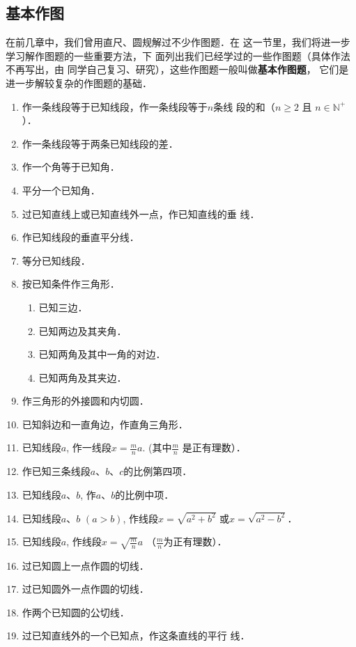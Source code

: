 \subsection{基本作图}
在前几章中，我们曾用直尺、圆规解过不少作图题．在
这一节里，我们将进一步学习解作图题的一些重要方法，下
面列出我们已经学过的一些作图题（具体作法不再写出，由
同学自己复习、研究），这些作图题一般叫做\textbf{基本作图题}，
它们是进一步解较复杂的作图题的基础．
\begin{enumerate}
\item 作一条线段等于已知线段，作一条线段等于$n$条线
段的和（$n\ge 2$ 且 $n\in\mathbb{N}^+$）．
\item 作一条线段等于两条已知线段的差．
\item 作一个角等于已知角．
\item 平分一个已知角．
\item 过已知直线上或已知直线外一点，作已知直线的垂
线．
\item 作已知线段的垂直平分线．
\item 等分已知线段．
\item 按已知条件作三角形．
\begin{enumerate}
 \item 已知三边．
\item 已知两边及其夹角．
\item 已知两角及其中一角的对边．
\item 已知两角及其夹边． 
\end{enumerate}
\item 作三角形的外接圆和内切圆．
\item 已知斜边和一直角边，作直角三角形．
\item 已知线段$a$, 作一线段$x=\frac{m}{n}a$. (其中$\frac{m}{n}$
是正有理数）．
\item 作已知三条线段$a$、$b$、$c$的比例第四项．
\item 已知线段$a$、$b$, 作$a$、$b$的比例中项．
\item 已知线段$a$、$b$ $(a>b)$, 作线段$x=\sqrt{a^2+b^2}$
或$x=\sqrt{a^2-b^2}$．
\item 已知线段$a$, 作线段$x=\sqrt{\frac{m}{n}}a$ （$\frac{m}{n}$为正有理数）．
\item 过已知圆上一点作圆的切线．
\item 过已知圆外一点作圆的切线．
\item 作两个已知圆的公切线．
\item 过已知直线外的一个已知点，作这条直线的平行
线．
\end{enumerate}

